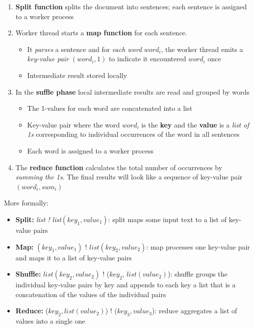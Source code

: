 \newpage
\begin{enumerate}
    \item \textbf{Split function} splits the document into sentences; each sentence is assigned to a worker process
    \item Worker thread starts a \textbf{map function} for each sentence. 
    \begin{itemize}
        \item It \textit{parses} a sentence and for \textit{each word} \(word_i\), the worker thread emits a \textit{key-value pair} \((word_i, 1)\) to indicate it encountered \(word_i\) once
        \item Intermediate result stored locally
    \end{itemize}
    \item In the \textbf{suffle phase} local intermediate results are read and grouped by words
    \begin{itemize}
        \item The 1-values for each word are concatenated into a list
        \item Key-value pair where the word \(word_i\) is the \textbf{key} and the \textbf{value} is a \textit{list of 1s} corresponding to individual occurrences of the word in all sentences
        \item Each word is assigned to a worker process
    \end{itemize}
    \item The \textbf{reduce function} calculates the total number of occurrences by \textit{summing the 1s}. The final results will look like a sequence of key-value pair \((word_i, sum_i)\)
\end{enumerate}

More formally:
\begin{itemize}
    \item \textbf{Split:} \textit{list ! list\((key_1, value_1)\)}:  split maps some input text to a list of key-value pairs
    \item \textbf{Map:} \((key_1, value_1)\) ! \(list(key_2, value_2)\): map processes one key-value pair and maps it to a list of key-value pairs
    \item \textbf{Shuffle:} \(list(key_2, value_2)\) ! (\(key_2\), \(list(value_2)\)): shuffle groups the individual key-value pairs by key and appends to each key a list that is a concatenation of the values of the individual pairs
    \item \textbf{Reduce:} (\(key_2, list(value_2)\)) ! (\(key_3, value_3\)): reduce aggregates a list of values into a single one
\end{itemize}


